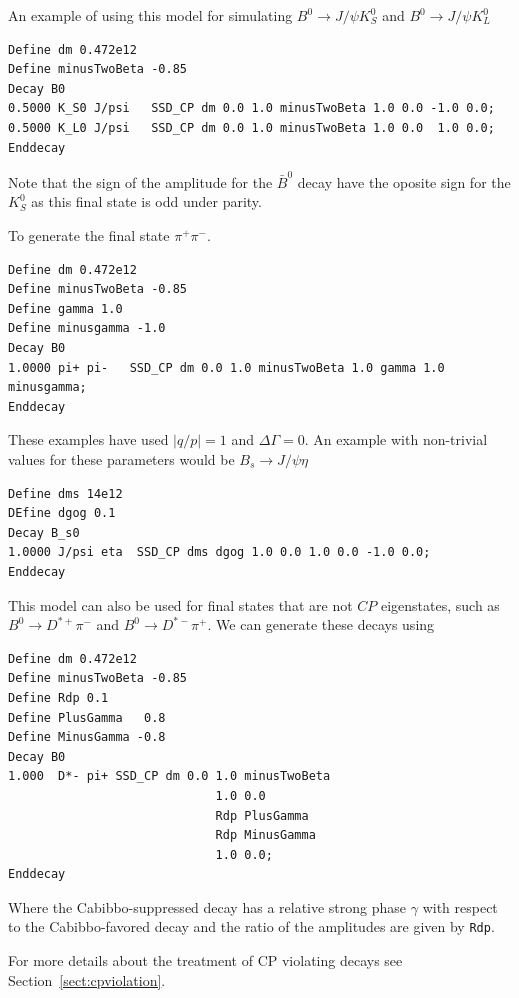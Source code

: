 An example of using this model for simulating $B^0\to J/\psi K_S^0$
and $B^0\to J/\psi K_L^0$
\begin{verbatim}
Define dm 0.472e12
Define minusTwoBeta -0.85
Decay B0
0.5000 K_S0 J/psi   SSD_CP dm 0.0 1.0 minusTwoBeta 1.0 0.0 -1.0 0.0;
0.5000 K_L0 J/psi   SSD_CP dm 0.0 1.0 minusTwoBeta 1.0 0.0  1.0 0.0;
Enddecay
\end{verbatim}
Note that the sign of the amplitude for the $\bar B^0$ decay have the 
oposite sign for the $K_S^0$ as this final state is odd under parity.

To generate the final state $\pi^+\pi^-$. 
\begin{verbatim}
Define dm 0.472e12
Define minusTwoBeta -0.85
Define gamma 1.0
Define minusgamma -1.0
Decay B0
1.0000 pi+ pi-   SSD_CP dm 0.0 1.0 minusTwoBeta 1.0 gamma 1.0 minusgamma;
Enddecay
\end{verbatim}
These examples have used $|q/p|=1$ and $\Delta\Gamma=0$. An
example with non-trivial values for these parameters
would be $B_s\to J/\psi \eta$
\begin{verbatim}
Define dms 14e12
DEfine dgog 0.1
Decay B_s0
1.0000 J/psi eta  SSD_CP dms dgog 1.0 0.0 1.0 0.0 -1.0 0.0;
Enddecay
\end{verbatim}

This model can also be used for final states that are not $CP$
eigenstates, such as $B^0\to D^{*+}\pi^-$
and $B^0\to D^{*-}\pi^+$. We can generate these decays using
\begin{verbatim}
Define dm 0.472e12
Define minusTwoBeta -0.85
Define Rdp 0.1
Define PlusGamma   0.8
Define MinusGamma -0.8
Decay B0
1.000  D*- pi+ SSD_CP dm 0.0 1.0 minusTwoBeta
                             1.0 0.0
                             Rdp PlusGamma
                             Rdp MinusGamma
                             1.0 0.0;
Enddecay
\end{verbatim}
Where the Cabibbo-suppressed decay has a relative strong phase $\gamma$ with
respect to the Cabibbo-favored decay and the ratio of the amplitudes are
given by {\tt Rdp}.



\Notes
For more details about the treatment of CP violating decays 
see Section~\ref{sect:cpviolation}.





\label{ssscp}



